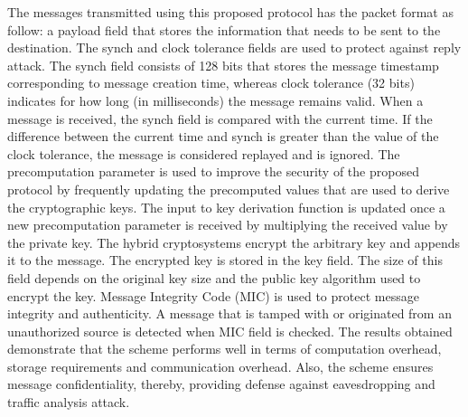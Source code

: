 \par The messages transmitted using this proposed protocol has the packet format as follow: a payload field that stores the information that needs to be sent to the destination. The synch and clock tolerance fields are used to protect against reply attack. The synch field consists of 128 bits that stores the message timestamp corresponding to message creation time, whereas clock tolerance (32 bits) indicates for how long (in milliseconds) the message remains valid. When a message is received, the synch field is compared with the current time. If the difference between the current time and synch is greater than the value of the clock tolerance, the message is considered replayed and is ignored. The precomputation parameter is used to improve the security of the proposed protocol by frequently updating the precomputed values that are used to derive the cryptographic keys. The input to key derivation function is updated once a new precomputation parameter is received by multiplying the received value by the private key. The hybrid cryptosystems encrypt the arbitrary key and appends it to the message. The encrypted key is stored in the key field. The size of this field depends on the original key size and the public key algorithm used to encrypt the key. Message Integrity Code (MIC) is used to protect message integrity and authenticity. A message that is tamped with or originated from an unauthorized source is detected when MIC field is checked. The results obtained demonstrate that the scheme performs well in terms of computation overhead, storage requirements and communication overhead. Also, the scheme ensures message confidentiality, thereby, providing defense against eavesdropping and traffic analysis attack. 

